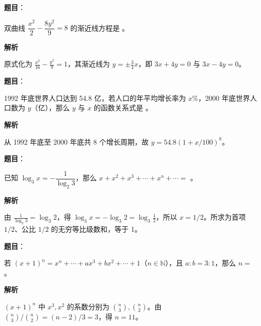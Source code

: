 \begin{answer}

\textbf{题目}：

双曲线 $\dfrac{x^2}{2}-\dfrac{8y^2}{9}=8$ 的渐近线方程是 \gkblank{}。

\textbf{解析}

原式化为 $\frac{x^2}{16}-\frac{y^2}{9}=1$，其渐近线为 $y=\pm\frac34x$，即 $3x+4y=0$ 与 $3x-4y=0$。


\end{answer}
\begin{answer}

\textbf{题目}：

1992 年底世界人口达到 54.8 亿，若人口的年平均增长率为 $x\%$，2000 年底世界人口数为 $y$（亿），那么 $y$ 与 $x$ 的函数关系式是 \gkblank{}。

\textbf{解析}

从 1992 年底至 2000 年底共 8 个增长周期，故 $y=54.8(1+x/100)^8$。


\end{answer}
\begin{answer}

\textbf{题目}：

已知 $\log_3x=-\dfrac1{\log_2 3}$，那么 $x+x^2+x^3+\cdots+x^n+\cdots=$ \gkblank{}。

\textbf{解析}

由 $\frac1{\log_2 3}=\log_3 2$，得 $\log_3x=-\log_3 2=\log_3\frac12$，所以 $x=1/2$。所求为首项 $1/2$、公比 $1/2$ 的无穷等比级数和，等于 1。


\end{answer}
\begin{answer}

\textbf{题目}：

若 $(x+1)^n=x^n+\cdots+ax^3+bx^2+\cdots+1$（$n\in\mathbb N$），且 $a:b=3:1$，那么 $n=$ \gkblank{}。

\textbf{解析}

$(x+1)^n$ 中 $x^3,x^2$ 的系数分别为 $\binom n3,\binom n2$。由 $\binom n3/\binom n2=(n-2)/3=3$，得 $n=11$。


\end{answer}
